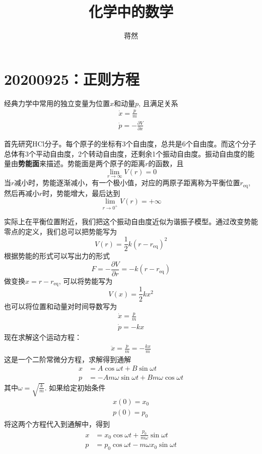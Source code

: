 \documentclass[12pt]{article}
\title{\heiti 化学中的数学}
\author{\kaishu 蒋然}
\begin{document}
\maketitle
\tableofcontents

\section{20200925：正则方程}

经典力学中常用的独立变量为位置$x$和动量$p$, 且满足关系
\begin{align*}
    \dot{x} = \frac pm\\
    \dot{p} = -\frac {\partial V}{\partial x}
\end{align*}

首先研究HCl分子。每个原子的坐标有3个自由度，总共是6个自由度。而这个分子总体有3个平动自由度，2个转动自由度，还剩余1个振动自由度。振动自由度的能量由\textbf{势能面}来描述。势能面是两个原子的距离$r$的函数，且
\begin{equation*}
    \lim_{r \to \infty} V(r) = 0
\end{equation*}
当$r$减小时，势能逐渐减小，有一个极小值，对应的两原子距离称为平衡位置$r_\mathrm{eq}$, 然后再减小$r$时，势能增大，最后达到
\begin{equation*}
    \lim_{r \to 0^+} V(r) = +\infty
\end{equation*}

实际上在平衡位置附近，我们把这个振动自由度近似为谐振子模型。通过改变势能零点的定义，我们总可以把势能写为
\begin{equation*}
    V(r) = \frac 12 k(r-r_\mathrm{eq})^2
\end{equation*}
根据势能的形式可以写出力的形式
\begin{equation*}
    F = -\frac {\partial V}{\partial r} = -k(r-r_\mathrm{eq})
\end{equation*}
做变换$x = r - r_\mathrm{eq}$, 可以将势能写为
\begin{equation*}
    V(x) = \frac 12 kx^2
\end{equation*}
也可以将位置和动量对时间导数写为
\begin{align*}
    \dot{x} = \frac pm\\
    \dot{p} = -kx
\end{align*}
现在求解这个运动方程：
\begin{align*}
    \ddot{x} = \frac {\dot{p}}m = -\frac {kx}{m}
\end{align*}
这是一个二阶常微分方程，求解得到通解
\begin{align*}
    x &= A \cos{\omega t} + B \sin{\omega t}\\
    p &= -{Am\omega} \sin{\omega t} + {Bm \omega} \cos{\omega t}
\end{align*}
其中$\omega = \sqrt{\frac km}$. 如果给定初始条件
\begin{align*}
    x(0) = x_0\\
    p(0) = p_0
\end{align*}
将这两个方程代入到通解中，得到
\begin{align*}
    x &= x_0 \cos{\omega t} + \frac {p_0}{m\omega} \sin{\omega t}\\
    p &= p_0 \cos{\omega t} - {m\omega x_0} \sin{\omega t}
\end{align*}
\end{document}
